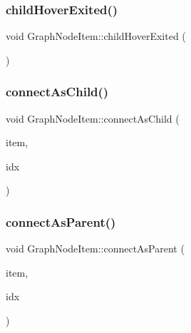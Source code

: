 \mbox{\label{class_graph_node_item_a8a706cb476880abfb2125120dc000d23}} 
\subsubsection{\texorpdfstring{childHoverExited()}{childHoverExited()}}
{\footnotesize\ttfamily void Graph\+Node\+Item\+::child\+Hover\+Exited (\begin{DoxyParamCaption}{ }\end{DoxyParamCaption})}

\mbox{\label{class_graph_node_item_a328fab10f885d7e05e0467598f584d7f}} 
\subsubsection{\texorpdfstring{connectAsChild()}{connectAsChild()}}
{\footnotesize\ttfamily void Graph\+Node\+Item\+::connect\+As\+Child (\begin{DoxyParamCaption}\item[{\mbox{\hyperlink{class_graph_node_item}{Graph\+Node\+Item}} $\ast$}]{item,  }\item[{int}]{idx }\end{DoxyParamCaption})}

\mbox{\label{class_graph_node_item_ad0cbf9d18e5007b89655412fb1baf14d}} 
\subsubsection{\texorpdfstring{connectAsParent()}{connectAsParent()}}
{\footnotesize\ttfamily void Graph\+Node\+Item\+::connect\+As\+Parent (\begin{DoxyParamCaption}\item[{\mbox{\hyperlink{class_graph_node_item}{Graph\+Node\+Item}} $\ast$}]{item,  }\item[{int}]{idx }\end{DoxyParamCaption})}

